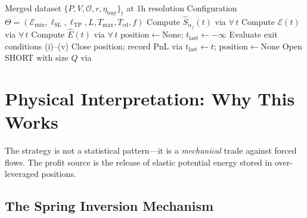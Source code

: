 \documentclass[11pt,a4paper]{article}
\newcommand{\af}{\alpha_f}
\newcommand{\OI}{\mathcal{O}}
\begin{document}
\begin{algorithm}[H]
\caption{$\af$ Bifurcation Short Strategy}
\label{alg:strategy}
\begin{algorithmic}[1]
\Require Merged dataset $\{P, V, \OI, r, \eta_{\mathrm{buy}}\}_t$ at 1h resolution
\Require Configuration $\Theta = (\mathcal{E}_{\min}, \ell_{\mathrm{SL}}, \ell_{\mathrm{TP}}, L, T_{\max}, T_{\mathrm{cd}}, f)$
\State Compute $\hat{S}_{\af}(t)$ via  $\forall\,t$
\State Compute $\mathcal{E}(t)$ via  $\forall\,t$
\State Compute $\hat{E}(t)$ via  $\forall\,t$
\State $\mathrm{position} \gets \mathrm{None}$; \; $t_{\mathrm{last}} \gets -\infty$
        \State Evaluate exit conditions (i)--(v)
            \State Close position; record PnL via 
            \State $t_{\mathrm{last}} \gets t$; \; $\mathrm{position} \gets \mathrm{None}$
        \EndIf
    \Else
                \State Open SHORT with size $Q$ via 
            \EndIf
        \EndIf
    \EndIf
\EndFor
\end{algorithmic}
\end{algorithm}


\section{Physical Interpretation: Why This Works}
\label{sec:physics}

The strategy is not a statistical pattern---it is a \emph{mechanical} trade 
against forced flows. The profit source is the release of elastic potential 
energy stored in over-leveraged positions.

\subsection{The Spring Inversion Mechanism}
\end{document}

